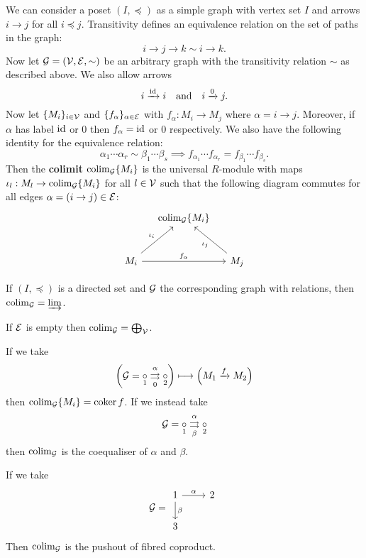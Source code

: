 \begin{defn}
	We can consider a poset $(I,\preceq)$ as a simple graph with vertex set $I$ and arrows $i \to j$ for all $i \preceq j$.
	Transitivity defines an equivalence relation on the set of paths in the graph:
	\[i \to j \to k \sim i \to k.\]
	Now let $\mathcal{G} = (\mathcal{V},\mathcal{E},\sim)$ be an arbitrary graph with the transitivity relation $\sim$ as described above.
	We also allow arrows
	\[i \xrightarrow{\operatorname{id}} i \quad \text{and} \quad i \xrightarrow{0} j.\]
	Now let $\{M_i\}_{i \in \mathcal{V}}$ and $\{f_\alpha\}_{\alpha \in \mathcal{E}}$
	with $f_\alpha: M_i \to M_j$ where $\alpha = i \to j$.
	Moreover, if $\alpha$ has label $\operatorname{id}$ or $0$ then $f_\alpha = \operatorname{id}$ or $0$ respectively.
	We also have the following identity for the equivalence relation:
	\[\alpha_1 \cdots \alpha_r \sim \beta_1 \cdots \beta_s \implies f_{\alpha_1} \cdots f_{\alpha_r} = f_{\beta_1} \cdots f_{\beta_s}.\]
	Then the \textbf{colimit} $\operatorname*{colim}_{\mathcal{G}}\{M_i\}$ is the universal $R$-module with maps $\iota_l: M_l \to \operatorname*{colim}_{\mathcal{G}}\{M_i\}$ for all $l \in \mathcal{V}$ such that the following diagram commutes for all edges $\alpha = (i \to j) \in \mathcal{E}$:
	\[\begin{tikzcd}[row sep=large,column sep=small]
		& \colim_{\ca G}\{M_i\} & \\
		M_i \ar[ru, "\iota_i"] \ar[rr, "f_\alpha"] & & M_j \ar[lu, "\iota_j"]
	\end{tikzcd}\]
\end{defn}

\begin{exam}
	\leavevmode
	\begin{enum}
		\io
		If $(I,\preceq)$ is a directed set and $\mathcal{G}$ the corresponding graph with relations, then $\operatorname*{colim}_{\mathcal{G}}=\varinjlim$.
		
		\io
		If $\mathcal{E}$ is empty then $\operatorname*{colim}_{\mathcal{G}} = \bigoplus_{\mathcal{V}}$.
		
		\io
		If we take
		\[\left( \mathcal{G} = \underset{1}{\circ} \underset{0}{\overset{\alpha}{\rightrightarrows}} \underset{2}{\circ} \right) \longmapsto \left( M_1 \xrightarrow{f} M_2 \right)\]
		then $\operatorname*{colim}_{\mathcal{G}}\{M_i\} = \operatorname{coker} f$.
		If we instead take
		\[\mathcal{G} = \underset{1}{\circ} \underset{\beta}{\overset{\alpha}{\rightrightarrows}} \underset{2}{\circ}\]
		then $\operatorname*{colim}_{\mathcal{G}}$ is the coequaliser of $\alpha$ and $\beta$.
		
		\io
		If we take
		\[\ca G=
		\begin{tikzcd}
			1 \ar[r, "\alpha"] \ar[d, "\beta"] & 2 \\
			3 &
		\end{tikzcd}\]
		Then $\operatorname*{colim}_{\mathcal{G}}$ is the pushout of fibred coproduct.
	\end{enum}
\end{exam}

